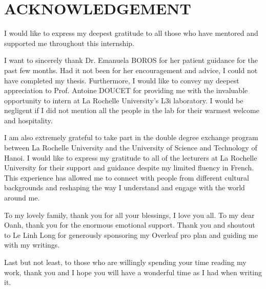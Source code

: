\documentclass[11pt]{extarticle}
\begin{document}
\newpage
\tableofcontents
\setlength{\parindent}{0pt}

\setlength{\parindent}{0pt}
\setlength{\parskip}{1em}
\newpage


\section*{ACKNOWLEDGEMENT}

I would like to express my deepest gratitude to all those who have mentored and supported me throughout this internship.

I want to sincerely thank Dr. Emanuela BOROS for her patient guidance for the past few months. Had it not been for her encouragement and advice, I could not have completed my thesis. Furthermore, I would like to convey my deepest appreciation to Prof. Antoine DOUCET for providing me with the invaluable opportunity to intern at La Rochelle University's L3i laboratory. I would be negligent if I did not mention all the people in the lab for their warmest welcome and hospitality.

I am also extremely grateful to take part in the double degree exchange program between La Rochelle University and the University of Science and Technology of Hanoi. I would like to express my gratitude to all of the lecturers at La Rochelle University for their support and guidance despite my limited fluency in French. This experience has allowed me to connect with people from different cultural backgrounds and reshaping the way I understand and engage with the world around me.

To my lovely family, thank you for all your blessings, I love you all. To my dear Oanh, thank you for the enormous emotional support. Thank you and shoutout to Le Linh Long for generously sponsoring my Overleaf pro plan and guiding me with my writings.

Last but not least, to those who are willingly spending your time reading my work, thank you and I hope you will have a wonderful time as I had when writing it.

\newpage

\end{document}
